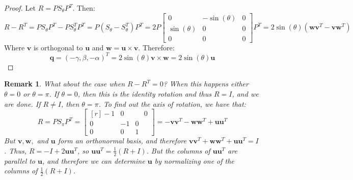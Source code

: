 \documentclass[oneside]{book}
\theoremstyle{mystyle}
\newtheorem{remark}{Remark}[section]
\begin{document}
\begin{proof}
Let $R = PS_{\theta}P^T$. Then:
\begin{equation*}
    R-R^{T}=PS_{\theta}P^{T}-PS_{\theta}^{T}P^{T}=P(S_{\theta}-S_{\theta}^{T})P^{T}=2P\begin{bmatrix}0 & -\sin(\theta) & 0 \\ \sin(\theta) & 0 & 0 \\ 0 & 0 & 0 \end{bmatrix}P^{T}= 2\sin(\theta)(\mathbf{w}\mathbf{v}^{T} - \mathbf{v}\mathbf{w}^{T})
\end{equation*} 
Where $\mathbf{v}$ is orthogonal to $\mathbf{u}$ and $\mathbf{w} = \mathbf{u}\times \mathbf{v}$. Therefore:
\begin{equation*}
    \mathbf{q} = (-\gamma, \beta, -\alpha)^{T} = 2\sin(\theta) \mathbf{v}\times \mathbf{w} = 2\sin(\theta) \mathbf{u}
\end{equation*}
\end{proof}
\begin{remark}
What about the case when $R-R^T = 0$? When this happens either $\theta = 0$ or $\theta = \pi$. If $\theta = 0$, then this is the identity rotation and thus $R = I$, and we are done. If $R\ne I$, then $\theta = \pi$. To find out the axis of rotation, we have that:
\begin{equation*}
    R = PS_{\pi}P^T = \begin{bmatrix*}[r]-1 & 0 & \phantom{-}0 \\ 0 & -1 & 0 \\ 0 & 0 & 1 \end{bmatrix*} = -\mathbf{v}\mathbf{v}^T-\mathbf{w}\mathbf{w}^T +\mathbf{u}\mathbf{u}^T    
\end{equation*}
But $\mathbf{v},\mathbf{w},$ and $\mathbf{u}$ form an orthonormal basis, and therefore $\mathbf{v}\mathbf{v}^T + \mathbf{w}\mathbf{w}^T+\mathbf{u}\mathbf{u}^T = I$. Thus, $R = -I+2\mathbf{u}\mathbf{u}^T$, so $\mathbf{u} \mathbf{u}^T = \frac{1}{2}(R+I)$. But the columns of $\mathbf{u}\mathbf{u}^T$ are parallel to $\mathbf{u}$, and therefore we can determine $\mathbf{u}$ by normalizing one of the columns of $\frac{1}{2}(R+I)$.
\end{remark}
\end{document}
